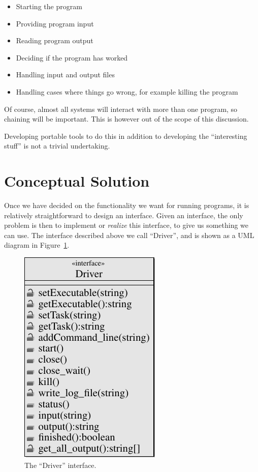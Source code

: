 \documentclass[a4paper, 11pt]{article}
\begin{document}
\begin{itemize}
\item{Starting the program}
\item{Providing program input}
\item{Reading program output}
\item{Deciding if the program has worked}
\item{Handling input and output files}
\item{Handling cases where things go wrong, for example killing the program}
\end{itemize}

Of course, almost all systems will interact with more than one program, 
so chaining will be important. This is however out of the scope of this 
discussion. 

Developing portable tools to do this in addition to developing the 
``interesting stuff'' is not a trivial undertaking. 

\section{Conceptual Solution}

Once we have decided on the functionality we want for running programs, 
it is relatively straightforward to design an interface. Given an interface,
the only problem is then to implement or \emph{realize} this interface,
to give us something we can use. The interface described above we call 
``Driver'', and is shown as a UML diagram in 
Figure~\ref{figure:driverinterface}.

\begin{figure}
\centerline{
\includegraphics[scale=0.667]{UML/DriverInterface-1.pdf}
}
\caption{The ``Driver'' interface.}
\label{figure:driverinterface}
\end{figure}
\end{document}
